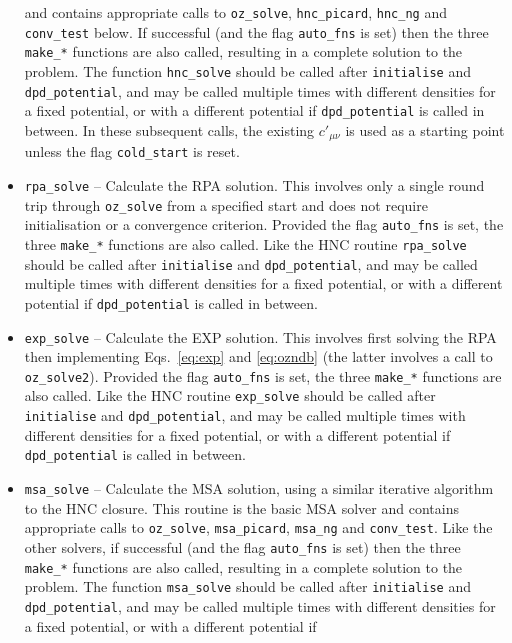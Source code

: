 \documentclass[12pt,a4paper]{article}
\newcommand{\Eqsref}[1]{Eqs.~\eqref{#1}}
\begin{document}
\begin{itemize}
  and contains appropriate calls to \verb+oz_solve+,
  \verb+hnc_picard+, \verb+hnc_ng+ and \verb+conv_test+ below.
  If successful (and the flag \verb+auto_fns+ is set) then the three
  \verb+make_*+ functions are also called, resulting in a complete
  solution to the problem.  The function \verb+hnc_solve+ should be
  called after \verb+initialise+ and \verb+dpd_potential+, and may be
  called multiple times with different densities for a fixed
  potential, or with a different potential if \verb+dpd_potential+ is
  called in between.  In these subsequent calls, the existing
  $c'_{\mu\nu}$ is used as a starting point unless the flag
  \verb+cold_start+ is reset.
%
\item\verb+rpa_solve+ -- Calculate the RPA solution.  This involves
  only a single round trip through \verb+oz_solve+ from a specified
  start and does not require initialisation or a convergence
  criterion.  Provided the flag \verb+auto_fns+ is set, the three
  \verb+make_*+ functions are also called. Like the HNC routine
  \verb+rpa_solve+ should be called after \verb+initialise+ and
  \verb+dpd_potential+, and may be called multiple times with
  different densities for a fixed potential, or with a different
  potential if \verb+dpd_potential+ is called in between.
%
\item\verb+exp_solve+ -- Calculate the EXP solution.  This involves
  first solving the RPA then implementing \Eqsref{eq:exp} and
  \eqref{eq:ozndb} (the latter involves a call to \verb+oz_solve2+).
  Provided the flag \verb+auto_fns+ is set, the three \verb+make_*+
  functions are also called. Like the HNC routine \verb+exp_solve+
  should be called after \verb+initialise+ and \verb+dpd_potential+,
  and may be called multiple times with different densities for a
  fixed potential, or with a different potential if
  \verb+dpd_potential+ is called in between.
%
\item\verb+msa_solve+ -- Calculate the MSA solution, using a similar
  iterative algorithm to the HNC closure. This routine is the basic
  MSA solver and contains appropriate calls to \verb+oz_solve+,
  \verb+msa_picard+, \verb+msa_ng+ and \verb+conv_test+.  Like the
  other solvers, if successful (and the flag \verb+auto_fns+ is set)
  then the three \verb+make_*+ functions are also called, resulting in
  a complete solution to the problem.  The function \verb+msa_solve+
  should be called after \verb+initialise+ and \verb+dpd_potential+,
  and may be called multiple times with different densities for a
  fixed potential, or with a different potential if

\end{itemize}
\end{document}
